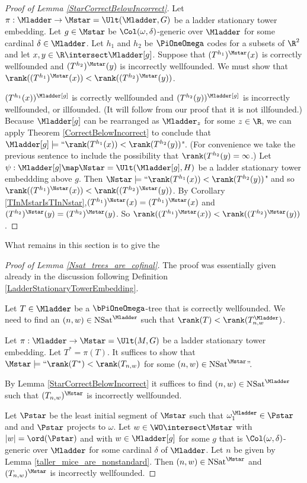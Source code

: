 \documentclass[oneside,12pt]{amsart}
\DeclareMathOperator{\NSat}{NSat}
\begin{document}
\begin{proof}[Proof of Lemma \ref{StarCorrectBelowIncorrect}]
Let $\pi:\Mladder\to\Mstar=\Ult(\Mladder,G)$ be a ladder stationary tower embedding.
Let $g\in\Mstar$ be $\Col(\omega,\delta)$-generic over $\Mladder$ for some cardinal $\delta\in\Mladder$.
Let $h_1$ and $h_2$ be $\PiOneOmega$ codes for a subsets
of $\R^2$ and let $x,y\in\R\intersect \Mladder[g]$. Suppose that
$(T^{h_1})^{\Mstar}(x)$ is correctly wellfounded and $(T^{h_2})^{\Mstar}(y)$ is incorrectly wellfounded.
We must show that $\rank((T^{h_1})^{\Mstar}(x))<\rank((T^{h_2})^{\Mstar}(y))$.


$(T^{h_1}(x))^{\Mladder[g]}$
is correctly wellfounded and
$(T^{h_2}(y))^{\Mladder[g]}$
is incorrectly wellfounded, or illfounded. (It will follow from our proof that it is not illfounded.)
Because $\Mladder[g]$ can be rearranged as $\Mladder_z$ for some $z\in\R$,
we can apply Theorem \ref{CorrectBelowIncorrect} to conclude that
$\Mladder[g]\models \text{``}\rank(T^{h_1}(x)) < \rank(T^{h_2}(y))$". (For convenience we take the previous
sentence to include the possibility that $\rank(T^{h_2}(y)=\infty$.)
Let $\psi:\Mladder[g]\map\Nstar=\Ult(\Mladder[g],H)$ be a ladder stationary tower embeddding
above $g$. Then $\Nstar\models \text{``}\rank(T^{h_1}(x)) < \rank(T^{h_2}(y))$" and
so $\rank((T^{h_1})^{\Nstar}(x)) < \rank((T^{h_2})^{\Nstar}(y))$.
By Corollary \ref{TInMstarIsTInNstar},$(T^{h_1})^{\Nstar}(x)=(T^{h_1})^{\Mstar}(x)$ and
$(T^{h_2})^{\Nstar}(y)=(T^{h_2})^{\Mstar}(y)$.
So $\rank((T^{h_1})^{\Mstar}(x))<\rank((T^{h_2})^{\Mstar}(y))$.
\end{proof}

What remains in this section is to give the
\begin{proof}[Proof of Lemma \ref{Nsat_trees_are_cofinal}]
The proof was essentially given already in the discussion following Definition
\ref{LadderStationaryTowerEmbedding}.

Let $T\in\Mladder$ be a $\bPiOneOmega$-tree that is correctly wellfounded.
We need to find an $(n,w)\in \NSat^{\Mladder}$ such that $\rank(T) < \rank(T^{\Mladder}_{n,w})$.

Let $\pi:\Mladder\to\Mstar=\Ult(M,G)$ be a ladder stationary tower embedding.
Let $T^* = \pi(T)$. It suffices to show that
$\Mstar\models\text{``}\rank(T^*) < \rank(T_{n,w})$ for some $(n,w)\in \NSat^{\Mstar}$''.

By Lemma \ref{StarCorrectBelowIncorrect} it suffices to find
$(n,w)\in \NSat^{\Mladder}$ such that $(T_{n,w})^{\Mstar}$ is incorrectly wellfounded.


Let $\Pstar$ be the least initial segment of $\Mstar$ such that
$\omega_1^{\Mladder}\in\Pstar$ and
and $\Pstar$ projects to $\omega$.
Let $w\in\WO\intersect\Mstar$ with $|w|=\ord(\Pstar)$ and with $w\in \Mladder[g]$ for
some $g$ that is $\Col(\omega,\delta)$-generic over $\Mladder$ for some cardinal $\delta$ of $\Mladder$.
Let
$n$ be given by Lemma \ref{taller_mice_are_nonstandard}. Then
$(n,w)\in \NSat^{\Mstar}$ and
$(T_{n,w})^{\Mstar}$ is incorrectly wellfounded.
\end{proof}




\end{document}
